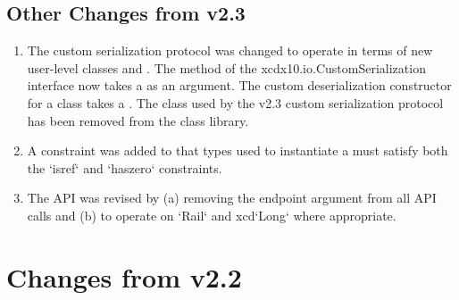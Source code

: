 \subsection{Other Changes from \Xten{} v2.3}

\begin{enumerate}
\item The custom serialization protocol was changed to operate in
  terms of new user-level classes  and
  .  The  method of
  the xcd{x10.io.CustomSerialization} interface now takes a
   as an argument.  The custom deserialization
  constructor for a class takes a . The
   class used by the \Xten{} v2.3 custom
  serialization protocol has been removed from the class library. 

\item A constraint was added to  that types used
  to instantiate a  must satisfy both the
  \xcd`isref` and \xcd`haszero` constraints.

\item The  API was revised by (a) removing the
  endpoint argument from all API calls and (b) to operate on \xcd`Rail` and
  xcd`Long` where appropriate.
\end{enumerate}

\section{Changes from \Xten{} v2.2}


